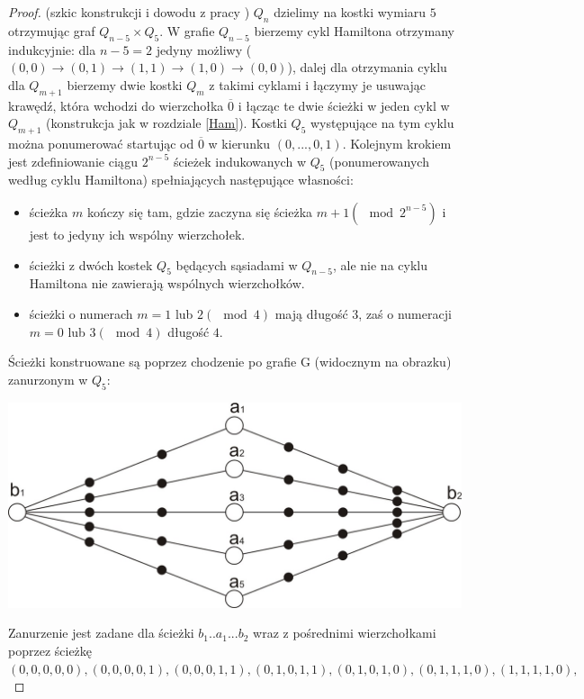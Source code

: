 \documentclass{pracamgr}
\begin{document}
     \begin{proof}(szkic konstrukcji i dowodu z pracy \cite{Snake2})
      $Q_n$ dzielimy na kostki wymiaru $5$ otrzymując graf $Q_{n-5}\times Q_5$. W grafie $Q_{n-5}$ bierzemy cykl Hamiltona otrzymany indukcyjnie:
      dla $n-5=2$ jedyny możliwy ($(0,0)\rightarrow(0,1)\rightarrow(1,1)\rightarrow(1,0)\rightarrow(0,0)$),
      dalej dla otrzymania cyklu dla $Q_{m+1}$ bierzemy dwie kostki $Q_m$ z takimi cyklami i łączymy je usuwając krawędź, która wchodzi do wierzchołka
      $\overline{0}$ i łącząc te dwie ścieżki w jeden cykl w $Q_{m+1}$ (konstrukcja jak w rozdziale \ref{Ham}).
      Kostki $Q_5$ występujące na tym cyklu można ponumerować startując od $\overline{0}$ w kierunku $(0,...,0,1)$.\newline
      Kolejnym krokiem jest zdefiniowanie ciągu $2^{n-5}$ ścieżek indukowanych w $Q_5$ (ponumerowanych według cyklu Hamiltona)
      spełniających następujące własności:
      \begin{itemize}
       \item ścieżka $m$ kończy się tam, gdzie zaczyna się ścieżka $m+1 (\mod 2^{n-5})$ i jest to jedyny ich wspólny wierzchołek.
       \item ścieżki z dwóch kostek $Q_5$ będących sąsiadami w $Q_{n-5}$, ale nie na cyklu Hamiltona nie zawierają wspólnych wierzchołków.
       \item ścieżki o numerach $m=1$ lub $2(\mod 4)$ mają długość $3$, zaś o numeracji $m=0$ lub $3(\mod 4)$ długość $4$.
      \end{itemize}\newpage
      Ścieżki konstruowane są poprzez chodzenie po grafie G (widocznym na obrazku) zanurzonym w $Q_5$:
      \begin{center}
       \includegraphics[scale=1]{img/snake_G.jpg}
      \end{center}
      Zanurzenie jest zadane dla ścieżki $b_1..a_1...b_2$ wraz z pośrednimi wierzchołkami poprzez ścieżkę
      $(0,0,0,0,0),(0,0,0,0,1),(0,0,0,1,1),(0,1,0,1,1),(0,1,0,1,0),(0,1,1,1,0),(1,1,1,1,0),$\newline

\end{proof}
\end{document}
